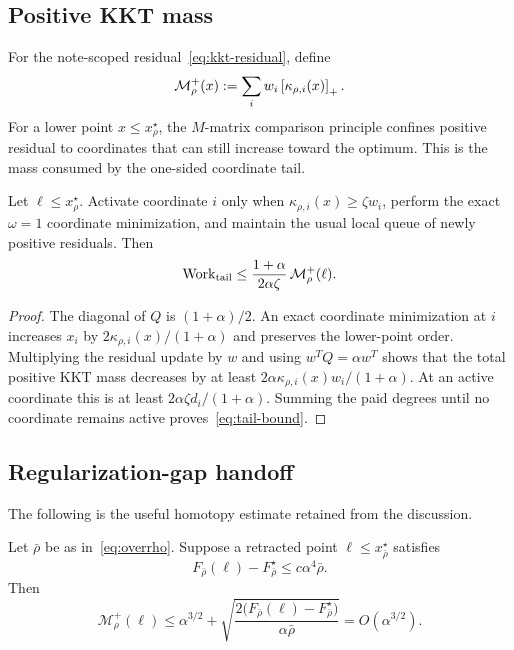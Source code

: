 \subsection{Positive KKT mass}

For the note-scoped residual~\eqref{eq:kkt-residual}, define
\begin{equation}
  \mathcal M_\rho^+(x)
  :=\sum_i w_i\left[\kappa_{\rho,i}(x)\right]_{+}.
  \label{eq:positive-kkt-mass}
\end{equation}
For a lower point $x\le x_\rho^\star$, the $M$-matrix comparison principle
confines positive residual to coordinates that can still increase toward the
optimum.  This is the mass consumed by the one-sided coordinate tail.

\begin{lemma}
\label{lem:tail}
Let $\ell\le x_\rho^\star$.  Activate coordinate $i$ only when
$\kappa_{\rho,i}(x)\ge\zeta w_i$, perform the exact $\omega=1$ coordinate
minimization, and maintain the usual local queue of newly positive residuals.
Then
\begin{equation}
  \operatorname{Work}_{\mathrm{tail}}
  \le
  \frac{1+\alpha}{2\alpha\zeta}\,
  \mathcal M_\rho^+(\ell).
  \label{eq:tail-bound}
\end{equation}
\end{lemma}

\begin{proof}
The diagonal of $Q$ is $(1+\alpha)/2$.  An exact coordinate minimization at
$i$ increases $x_i$ by
$2\kappa_{\rho,i}(x)/(1+\alpha)$ and preserves the lower-point order.  Multiplying
the residual update by $w$ and using $w^TQ=\alpha w^T$ shows that the total
positive KKT mass decreases by at least
$2\alpha \kappa_{\rho,i}(x)w_i/(1+\alpha)$.  At an active coordinate this is at
least $2\alpha\zeta d_i/(1+\alpha)$.  Summing the paid degrees until no
coordinate remains active proves~\eqref{eq:tail-bound}.
\end{proof}

\subsection{Regularization-gap handoff}

The following is the useful homotopy estimate retained from the discussion.

\begin{lemma}
\label{lem:handoff}
Let $\bar\rho$ be as in~\eqref{eq:overrho}.  Suppose a retracted point
$\ell\le x_{\bar\rho}^\star$ satisfies
\begin{equation}
  F_{\bar\rho}(\ell)-F_{\bar\rho}^\star
  \le c\alpha^4\bar\rho.
  \label{eq:warm-gap}
\end{equation}
Then
\begin{equation}
  \mathcal M_\rho^+(\ell)
  \le
  \alpha^{3/2}
  +\sqrt{
       \frac{2\bigl(F_{\bar\rho}(\ell)-F_{\bar\rho}^\star\bigr)}
            {\alpha\bar\rho}}
  =O(\alpha^{3/2}).
  \label{eq:homotopy-mass}
\end{equation}
\end{lemma}

